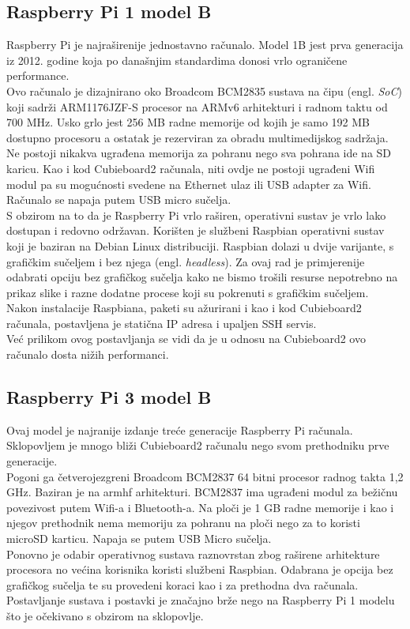 \documentclass[times, utf8, zavrsni, numeric]{fer}
\begin{document}
\subsection{Raspberry Pi 1 model B}
Raspberry Pi je najraširenije jednostavno računalo. Model 1B jest prva generacija iz 2012. godine koja po današnjim standardima
donosi vrlo ograničene performance. \\
Ovo računalo je dizajnirano oko Broadcom BCM2835 sustava na čipu (engl. \emph{SoC}) koji sadrži ARM1176JZF-S procesor na ARMv6
arhitekturi i radnom taktu od 700 MHz. Usko grlo jest 256 MB radne memorije od kojih je samo 192 MB dostupno procesoru a ostatak je
rezerviran za obradu multimedijskog sadržaja. Ne postoji nikakva ugrađena memorija za pohranu nego sva pohrana ide na SD karicu.
Kao i kod Cubieboard2 računala, niti ovdje ne postoji ugrađeni Wifi modul pa su mogućnosti svedene na Ethernet ulaz ili USB
adapter za Wifi. Računalo se napaja putem USB micro sučelja.\\
S obzirom na to da je Raspberry Pi vrlo raširen, operativni sustav je vrlo lako dostupan i redovno održavan. Korišten je službeni
Raspbian operativni sustav koji je baziran na Debian Linux distribuciji. Raspbian dolazi u dvije varijante, s grafičkim sučeljem
i bez njega (engl. \emph{headless}). Za ovaj rad je primjerenije odabrati opciju bez grafičkog sučelja kako ne bismo trošili
resurse nepotrebno na prikaz slike i razne dodatne procese koji su pokrenuti s grafičkim sučeljem. \\
Nakon instalacije Raspbiana, paketi su ažurirani i kao i kod Cubieboard2 računala, postavljena je statična IP adresa i upaljen SSH
servis. \\
Već prilikom ovog postavljanja se vidi da je u odnosu na Cubieboard2 ovo računalo dosta nižih performanci.
\subsection{Raspberry Pi 3 model B}
Ovaj model je najranije izdanje treće generacije Raspberry Pi računala. Sklopovljem je mnogo bliži Cubieboard2 računalu nego
svom prethodniku prve generacije. \\
Pogoni ga četverojezgreni Broadcom BCM2837 64 bitni procesor radnog takta 1,2 GHz. Baziran je na armhf arhitekturi.
BCM2837 ima ugrađeni modul za bežičnu povezivost putem Wifi-a i Bluetooth-a. Na ploči je 1 GB radne memorije i kao i njegov prethodnik
nema memoriju za pohranu na ploči nego za to koristi microSD karticu. Napaja se putem USB Micro sučelja. \\
Ponovno je odabir operativnog sustava raznovrstan zbog raširene arhitekture procesora no većina korisnika koristi službeni 
Raspbian. Odabrana je opcija bez grafičkog sučelja te su provedeni koraci kao i za prethodna dva računala. \\
Postavljanje sustava i postavki je značajno brže nego na Raspberry Pi 1 modelu što je očekivano s obzirom na sklopovlje.
\end{document}
